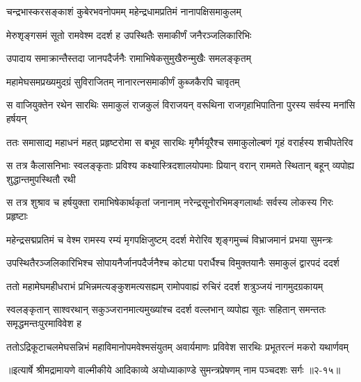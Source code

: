 \twolineshloka
{चन्द्रभास्करसङ्काशं कुबेरभवनोपमम्}
{महेन्द्रधामप्रतिमं नानापक्षिसमाकुलम्} %

\twolineshloka
{मेरुशृङ्गसमं सूतो रामवेश्म ददर्श ह}
{उपस्थितैः समाकीर्णं जनैरञ्जलिकारिभिः} %

\twolineshloka
{उपादाय समाक्रान्तैस्तदा जानपदैर्जनैः}
{रामाभिषेकसुमुखैरुन्मुखैः समलङ्कृतम्} %

\twolineshloka
{महामेघसमप्रख्यमुदग्रं सुविराजितम्}
{नानारत्नसमाकीर्णं कुब्जकैरपि चावृतम्} %

\twolineshloka
{स वाजियुक्तेन रथेन सारथिः समाकुलं राजकुलं विराजयन्}
{वरूथिना राजगृहाभिपातिना पुरस्य सर्वस्य मनांसि हर्षयन्} %

\twolineshloka
{ततः समासाद्य महाधनं महत् प्रहृष्टरोमा स बभूव सारथिः}
{मृगैर्मयूरैश्च समाकुलोल्बणं गृहं वरार्हस्य शचीपतेरिव} %

\twolineshloka
{स तत्र कैलासनिभाः स्वलङ्कृताः प्रविश्य कक्ष्यास्त्रिदशालयोपमाः}
{प्रियान् वरान् राममते स्थितान् बहून् व्यपोह्य शुद्धान्तमुपस्थितौ रथी} %

\twolineshloka
{स तत्र शुश्राव च हर्षयुक्ता रामाभिषेकार्थकृतां जनानाम्}
{नरेन्द्रसूनोरभिमङ्गलार्थाः सर्वस्य लोकस्य गिरः प्रहृष्टाः} %

\twolineshloka
{महेन्द्रसद्मप्रतिमं च वेश्म रामस्य रम्यं मृगपक्षिजुष्टम्}
{ददर्श मेरोरिव शृङ्गमुच्चं विभ्राजमानं प्रभया सुमन्त्रः} %

\twolineshloka
{उपस्थितैरञ्जलिकारिभिश्च सोपायनैर्जानपदैर्जनैश्च}
{कोट्या परार्धैश्च विमुक्तयानैः समाकुलं द्वारपदं ददर्श} %

\twolineshloka
{ततो महामेघमहीधराभं प्रभिन्नमत्यङ्कुशमत्यसह्यम्}
{रामोपवाह्यं रुचिरं ददर्श शत्रुञ्जयं नागमुदग्रकायम्} %

\twolineshloka
{स्वलङ्कृतान् साश्वरथान् सकुञ्जरानमात्यमुख्यांश्च ददर्श वल्लभान्}
{व्यपोह्य सूतः सहितान् समन्ततः समृद्धमन्तःपुरमाविवेश ह} %

\twolineshloka
{ततोऽद्रिकूटाचलमेघसन्निभं महाविमानोपमवेश्मसंयुतम्}
{अवार्यमाणः प्रविवेश सारथिः प्रभूतरत्नं मकरो यथार्णवम्} %


॥इत्यार्षे श्रीमद्रामायणे वाल्मीकीये आदिकाव्ये अयोध्याकाण्डे सुमन्त्रप्रेषणम् नाम पञ्चदशः सर्गः ॥२-१५॥

